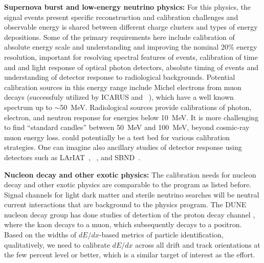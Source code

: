 \textbf{Supernova burst and low-energy neutrino physics:} For this physics, the signal events present specific reconstruction and calibration challenges and observable energy is shared between different charge clusters and types of energy depositions. Some of the primary requirements here include calibration of absolute energy scale and 
understanding and improving the nominal 20\% energy resolution, important for resolving spectral features of  events,
calibration of time and and light response of optical photon detectors, absolute timing of events and understanding of detector response to radiological backgrounds. Potential calibration sources in this energy range include Michel electrons from muon decays (successfuly utilized by ICARUS and ~\cite{Acciarri:2017sjy}), which have a well known spectrum up to $\sim$50~MeV. Radiological sources provide calibrations of photon, electron, and neutron response for energies below \SI{10}{\MeV}. It is more challenging to find ``standard candles'' between 50~MeV and \SI{100}{\MeV}, beyond cosmic-ray muon energy loss.  could potentially be a test bed for various calibration strategies. One can imagine also ancillary studies of detector response using detectors such as LArIAT~\cite{Cavanna:2014iqa}, ~\cite{Acciarri:2016smi}, and SBND~\cite{Antonello:2015lea}. %

\textbf{Nucleon decay and other exotic physics:} The calibration needs for nucleon decay and other exotic physics are comparable to the  program as listed before. Signal channels for light dark matter and sterile neutrino searches will be neutral current interactions that are background to the  physics program. The DUNE nucleon decay group has done studies of detection of the proton decay channel \ptoknubar, %
where the kaon decays to a muon, which subsequently decays to a positron. %
Based on the widths of $dE/dx$-based metrics of particle identification, qualitatively, we need to calibrate $dE/dx$ across all drift and track orientations at the few percent level or better, which is a similar target of interest as the  effort.

